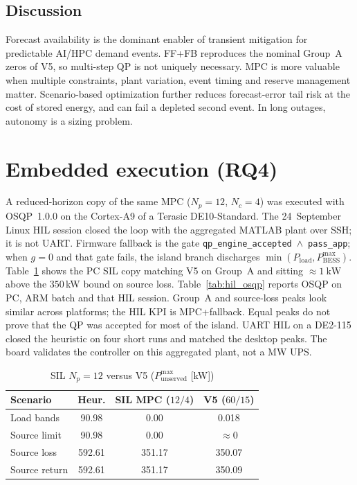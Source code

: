 \documentclass{ieeeaccess}
\begin{document}
\subsection{Discussion}
Forecast availability is the dominant enabler of transient mitigation for predictable AI/HPC demand events. FF+FB reproduces the nominal Group~A zeros of V5, so multi-step QP is not uniquely necessary. MPC is more valuable when multiple constraints, plant variation, event timing and reserve management matter. Scenario-based optimization further reduces forecast-error tail risk at the cost of stored energy, and can fail a depleted second event. In long outages, autonomy is a sizing problem.

\section{Embedded execution (RQ4)}
\label{sec:embedded}

A reduced-horizon copy of the same MPC ($N_p{=}12$, $N_c{=}4$) was executed with OSQP~1.0.0 on the Cortex-A9 of a Terasic DE10-Standard. The 24~September Linux HIL session closed the loop with the aggregated MATLAB plant over SSH; it is not UART. Firmware fallback is the gate \texttt{qp\_engine\_accepted}~$\wedge$~\texttt{pass\_app}; when $g{=}0$ and that gate fails, the island branch discharges $\min(P_{\mathrm{load}},P_{\mathrm{BESS}}^{\max})$. Table~\ref{tab:sil} shows the PC SIL copy matching V5 on Group~A and sitting $\approx\SI{1}{\kilo\watt}$ above the $350$\,kW bound on source loss. Table~\ref{tab:hil_osqp} reports OSQP on PC, ARM batch and that HIL session. Group~A and source-loss peaks look similar across platforms; the HIL KPI is MPC+fallback. Equal peaks do not prove that the QP was accepted for most of the island. UART HIL on a DE2-115 closed the heuristic on four short runs and matched the desktop peaks. The board validates the controller on this aggregated plant, not a MW UPS.

\begin{table}[!t]
\centering
\caption{SIL $N_p{=}12$ versus V5 ($P_{\mathrm{unserved}}^{\max}$ [kW])}
\label{tab:sil}
{\footnotesize
\begin{tabular}{@{}lccc@{}}
\toprule
Scenario & Heur. & SIL MPC ($12/4$) & V5 ($60/15$) \\
\midrule
Load bands & 90.98 & 0.00 & 0.018 \\
Source limit & 90.98 & 0.00 & $\approx 0$ \\
Source loss & 592.61 & 351.17 & 350.07 \\
Source return & 592.61 & 351.17 & 350.09 \\
\bottomrule
\end{tabular}}
\end{table}
\end{document}
